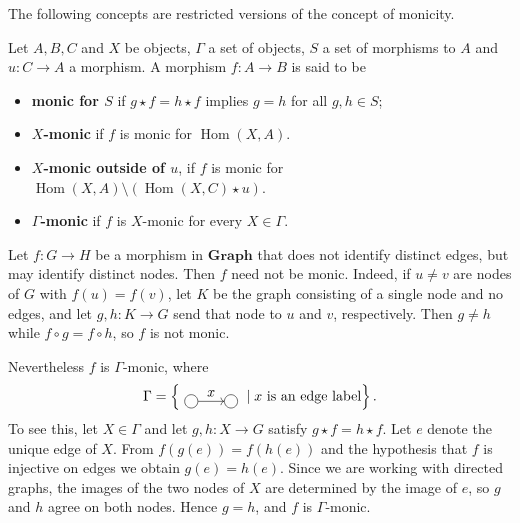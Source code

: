The following concepts are restricted versions of the concept of monicity.
\begin{definition}
    \label{def:relative_monicity}
    Let $A,B,C$ and $X$ be objects, $\Gamma$ a set of objects, $S$ a set of morphisms to $A$ and $u:C\to A$ a morphism. A morphism $f : A \to B$ is said to be
    \begin{itemize} 
        \item 
            \textbf{monic for $S$} 
            if $g \star f = h \star f$ implies $g = h$ for all $g, h \in S$;
        \item 
            \textbf{$X$-monic} if $f$ is monic for $\operatorname{Hom}(X, A)$.
        \item \textbf{$X$-monic outside of $u$}, if $f$ is monic for \( \operatorname{Hom}(X,A) \setminus \left ( \operatorname{Hom}(X,C) \star u \right ) \).
        \item  \textbf{$\Gamma$-monic} if $f$ is $X$-monic for every $X \in \Gamma$.
    \end{itemize}
\end{definition} 
\begin{example}
 
 Let \(f\colon G\to H\) be a morphism in \(\mathbf{Graph}\) that does not identify distinct edges, but may identify distinct nodes. Then \(f\) need not be monic. Indeed, if \(u\neq v\) are nodes of \(G\) with \(f(u)=f(v)\), let \(K\) be the graph consisting of a single node and no edges, and let \(g,h\colon K\to G\) send that node to \(u\) and \(v\), respectively. Then \(g\neq h\) while \(f\circ g=f\circ h\), so \(f\) is not monic.

Nevertheless \(f\) is \(\Gamma\)-monic, where
\[
\Gamma = \left\{ \vcenter{\hbox{
\begin{tikzpicture}[baseline=-0.5ex]
\node[draw,circle] (A) at (0,0) {};
\node[draw,circle] (B) at (1,0) {};
\draw[->] (A) -- (B) node[midway, above] {$x$};
\end{tikzpicture}
}} \mid x \text{ is an edge label} \right\}.
\]
To see this, let \(X\in\Gamma\) and let \(g,h\colon X\to G\) satisfy \(g \star f = h \star f\). Let \(e\) denote the unique edge of \(X\). From \(f(g(e))=f(h(e))\) and the hypothesis that \(f\) is injective on edges we obtain \(g(e)=h(e)\). Since we are working with directed graphs, the images of the two nodes of \(X\) are determined by the image of \(e\), so \(g\) and \(h\) agree on both nodes. Hence \(g=h\), and \(f\) is \(\Gamma\)-monic.

\end{example}
